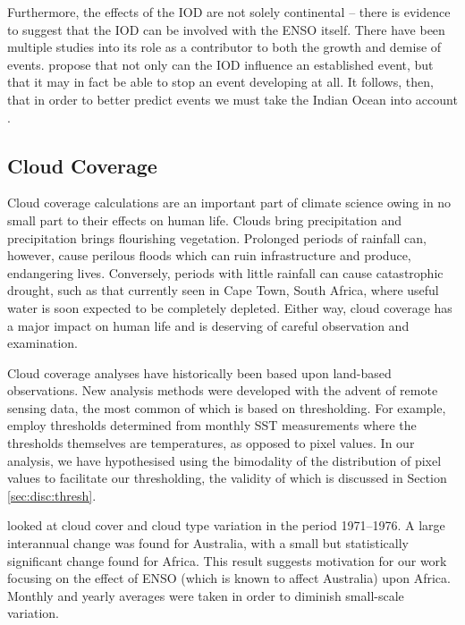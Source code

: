 Furthermore, the effects of the IOD are not solely continental -- there is
evidence to suggest that the IOD can be involved with the ENSO itself. There
have been multiple studies into its role as a contributor to both the growth
\citep{annamalai2005, hackert2017} and demise \citep{okumura2010, kug2006,
  xie2009, dayan2015} of \elnino{} events. \cite{dong2018} propose that not only
can the IOD influence an established \elnino{} event, but that it may in fact be
able to stop an \elnino{} event developing at all. It follows, then, that in
order to better predict \elnino{} events we must take the Indian Ocean into
account \citep{hackert2017}.

\subsection{Cloud Coverage}
\label{sec:intro:cc}
Cloud coverage calculations are an important part of climate science owing in no
small part to their effects on human life. Clouds bring precipitation and
precipitation brings flourishing vegetation. Prolonged periods of rainfall can,
however, cause perilous floods which can ruin infrastructure and produce,
endangering lives. Conversely, periods with little rainfall can cause
catastrophic drought, such as that currently seen in Cape Town, South Africa,
where useful water is soon expected to be completely depleted. Either way, cloud
coverage has a major impact on human life and is deserving of careful
observation and examination.

Cloud coverage analyses have historically been based upon land-based
observations. New analysis methods were developed with the advent of remote
sensing data, the most common of which is based on thresholding. For example,
\cite{derrien1993} employ thresholds determined from monthly SST measurements
where the thresholds themselves are temperatures, as opposed to pixel values. In
our analysis, we have hypothesised using the bimodality of the distribution of pixel
values to facilitate our thresholding, the validity of which is discussed in
Section \ref{sec:disc:thresh}.

\cite{warren2007} looked at cloud cover and cloud type variation in the period
1971--1976. A large interannual change was found for Australia, with a small but
statistically significant change found for Africa. This result suggests
motivation for our work focusing on the effect of ENSO (which is known to affect
Australia) upon Africa. Monthly and yearly averages were taken in order to
diminish small-scale variation.

